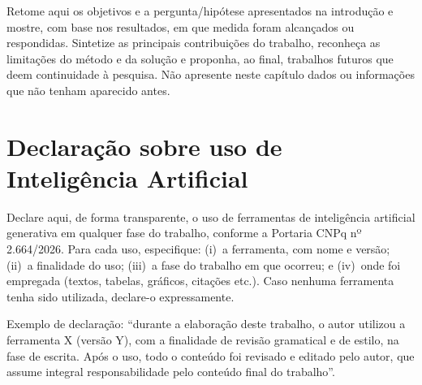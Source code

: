 \documentclass[tcc,capa]{texifsap}
\begin{document}

Retome aqui os objetivos e a pergunta/hipótese apresentados na
introdução e mostre, com base nos resultados, em que medida foram
alcançados ou respondidas. Sintetize as principais contribuições do
trabalho, reconheça as limitações do método e da solução e proponha, ao
final, trabalhos futuros que deem continuidade à pesquisa. Não apresente
neste capítulo dados ou informações que não tenham aparecido antes.

\section{Declaração sobre uso de Inteligência Artificial}


Declare aqui, de forma transparente, o uso de ferramentas de
inteligência artificial generativa em qualquer fase do trabalho,
conforme a Portaria CNPq nº 2.664/2026. Para cada uso, especifique:
(i)~a ferramenta, com nome e versão; (ii)~a finalidade do uso;
(iii)~a fase do trabalho em que ocorreu; e (iv)~onde foi empregada
(textos, tabelas, gráficos, citações etc.). Caso nenhuma ferramenta tenha
sido utilizada, declare-o expressamente.

Exemplo de declaração: ``durante a elaboração deste trabalho, o autor
utilizou a ferramenta X (versão Y), com a finalidade de revisão
gramatical e de estilo, na fase de escrita. Após o uso, todo o conteúdo
foi revisado e editado pelo autor, que assume integral responsabilidade
pelo conteúdo final do trabalho''.
\end{document}

